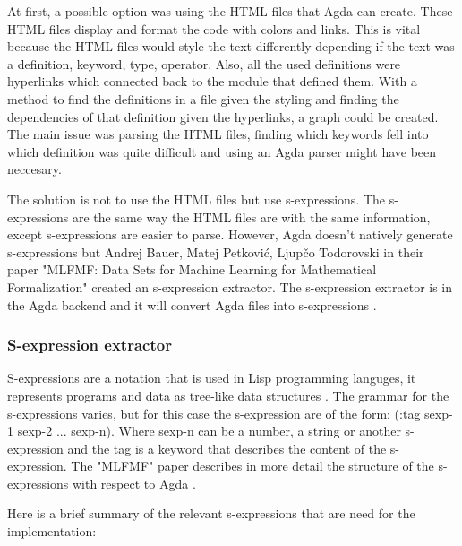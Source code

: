 At first, a possible option was using the HTML files that Agda can create.
These HTML files display and format the code with colors and links. This is
vital because the HTML files would style the text differently depending if the
text was a definition, keyword, type, operator. Also, all the used definitions
were hyperlinks which connected back to the module that defined them. With a
method to find the definitions in a file given the styling and finding the
dependencies of that definition given the hyperlinks, a graph could be created.
The main issue was parsing the HTML files, finding which keywords fell into
which definition was quite difficult and using an Agda parser might have been
neccesary.

The solution is not to use the HTML files but use s-expressions. The
s-expressions are the same way the HTML files are with the same information,
except s-expressions are easier to parse. However, Agda doesn't natively
generate s-expressions but Andrej Bauer, Matej Petković, Ljupčo Todorovski in
their paper "MLFMF: Data Sets for Machine Learning for Mathematical
Formalization" \cite{bauer2023mlfmf} created an s-expression extractor. The
s-expression extractor is in the Agda backend and it will convert Agda files into
s-expressions \cite{andrej}.

\subsubsection{S-expression extractor}

S-expressions are a notation that is used in Lisp programming languges, it
represents programs and data as tree-like data structures \cite{sexp}. The grammar for the
s-expressions varies, but for this case the s-expression are of the form: (:tag
sexp-1 sexp-2 ... sexp-n). Where sexp-n can be a number, a string or another
s-expression and the tag is a keyword that describes the content of the
s-expression. The "MLFMF" paper describes in more detail
the structure of the s-expressions with respect to Agda \cite{bauer2023mlfmf}.

Here is a brief summary of the relevant s-expressions that are need for the implementation:

